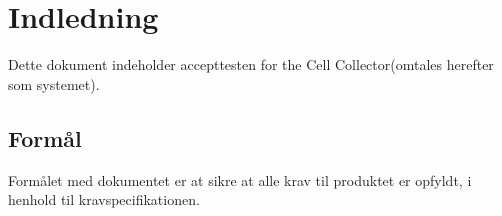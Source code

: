 \section{Indledning}
Dette dokument indeholder accepttesten for the Cell Collector(omtales herefter som systemet). 

\subsection{Formål}
Formålet med dokumentet er at sikre at alle krav til produktet er opfyldt, i henhold til kravspecifikationen.
